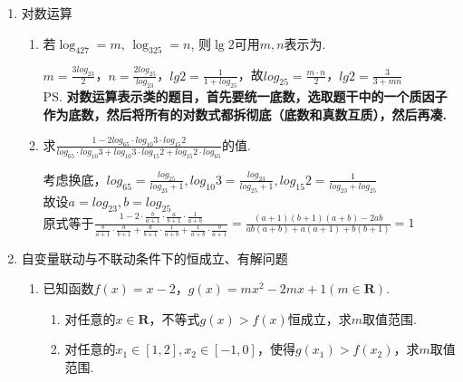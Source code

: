 \begin{enumerate}
\begin{enumerate}
        \begin{jieda}
        令$t=\log_2x$, 则$2t^2-7t+3\leq 0$, 解得$t\in[\frac{1}{2},3]$. \\
        故$y=(t-1)(t-2)=t^2-3t+2=(t-\frac{3}{2})^2-\frac{1}{4}\in[-\frac{1}{4},2]$. \\
        所以$f(x)_{\min}=f(2^{\frac{3}{2}})=-\frac{1}{4}$, $f(x)_{\max}=f(8)=2$. 
        \end{jieda}
    \end{enumerate}
    \item 对数运算 
    \begin{enumerate}
        \item 若$\log_427=m$, $\log_325=n$, 则$\lg2$可用$m,n$表示为. 
        \begin{jieda}
            $m = \frac{3log_23}{2}$，$n = \frac{2log_25}{log_23}$，$lg2 = \frac{1}{1+log_25}$，故$log_25 = \frac{m\cdot n}{2}$，$lg2 = \frac{3}{3+mn}$ \\
            \ps \textbf{对数运算表示类的题目，首先要统一底数，选取题干中的一个质因子作为底数，然后将所有的对数式都拆彻底（底数和真数互质），然后再凑.}
        \end{jieda}
        \item 求$\frac{1-2log_65 \cdot log_{10}3 \cdot log_{15}2}{log_65 \cdot log_{10}3 + log_{10}3 \cdot log_{15}2 + log_{15}2 \cdot log_65}$的值.
    \begin{jieda}
        考虑换底，$log_65 = \frac{log_25}{log_23+1}, log_{10}3 = \frac{log_23}{log_25+1}, log_{15}2 = \frac{1}{log_23 + log_25}$\\
        故设$a = log_23, b = log_25$\\
        原式等于$\frac{1 - 2 \cdot \frac{b}{a+1} \cdot \frac{a}{b+1} \cdot \frac{1}{a+b}}{\frac{b}{a+1}\cdot \frac{a}{b+1} + \frac{a}{b+1} \cdot \frac{1}{a+b} + \frac{1}{a+b} \cdot \frac{b}{a+1}} = \frac{(a+1)(b+1)(a+b) - 2ab}{ab(a+b) + a(a+1) + b(b+1)} = 1$
    \end{jieda}
    \end{enumerate}
    \item 自变量联动与不联动条件下的恒成立、有解问题
    \begin{enumerate}
        \item 已知函数$f(x) = x - 2$，$g(x) = mx^2-2mx+1(m \in \mathbf{R})$. 
        \begin{enumerate}[1.]
            \item 对任意的$x \in \mathbf{R}$，不等式$g(x) > f(x)$恒成立，求$m$取值范围.
            \item 对任意的$x_1 \in [1, 2], x_2 \in [-1, 0]$，使得$g(x_1) > f(x_2)$，求$m$取值范围.

\end{enumerate}
\end{enumerate}
\end{enumerate}

